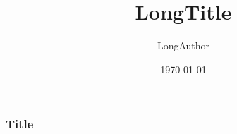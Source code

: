 \documentclass[12pt,t]{beamer}
\title[ShortTitle]{LongTitle}
\author[ShortAuthor]{LongAuthor}
\date{\today}
\institute{Universität Oldenburg}
\begin{document}
\frame{\titlepage}


\begin{frame}
	\frametitle{Title}
\end{frame}





\end{document}
